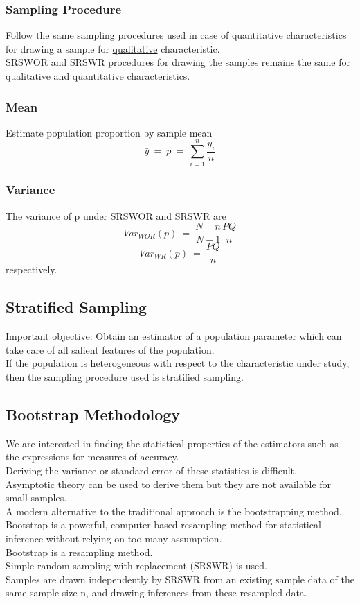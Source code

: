 \subsubsection*{Sampling Procedure}
Follow the same sampling procedures used in case of \underline{quantitative} characteristics for drawing a sample for \underline{qualitative} characteristic.\\
SRSWOR and SRSWR procedures for drawing the samples remains
the same for qualitative and quantitative characteristics.

\subsubsection*{Mean}
Estimate population proportion by sample mean
\[ \bar{y}\ =\ p\ =\ \sum_{i=1}^{n}\frac{y_i}{n} \]
\subsubsection*{Variance}
The variance of p under SRSWOR and SRSWR are
\[ Var_{WOR}(p)\ =\ \frac{N-n}{N-1}\frac{PQ}{n} \]
\[ Var_{WR}(p)\ =\ \frac{PQ}{n} \]
respectively.

\subsection*{Stratified Sampling}
Important objective: Obtain an estimator of a population parameter
which can take care of all salient features of the population.\\
If the population is heterogeneous with respect to the
characteristic under study, then the sampling procedure used is
stratified sampling.

\subsection*{Bootstrap Methodology}
We are interested in finding the statistical properties of the
estimators such as the expressions for measures of accuracy.\\
Deriving the variance or standard error of these statistics is difficult.\\
Asymptotic theory can be used to derive them but they are not
available for small samples.\\
A modern alternative to the traditional approach is the
bootstrapping method.\\
Bootstrap is a powerful, computer‐based resampling method for
statistical inference without relying on too many assumption.\\
Bootstrap is a resampling method.\\
Simple random sampling with replacement (SRSWR) is used.\\
Samples are drawn independently by SRSWR from an existing
sample data of the same sample size n, and drawing inferences
from these resampled data.

